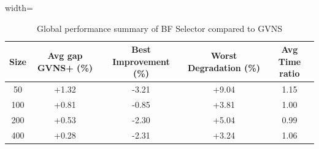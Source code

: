 \begin{table}[ht]
\centering
\footnotesize
\setlength{\tabcolsep}{4pt}
\caption{Global performance summary of BF Selector compared to GVNS}
\vspace{3mm}
\begin{adjustbox}{width=\textwidth}
\begin{tabular}{c c c c c}
\toprule
\textbf{Size} & \textbf{Avg gap GVNS+ (\%)} & \textbf{Best Improvement (\%)} & \textbf{Worst Degradation (\%)} & \textbf{Avg Time ratio} \\
\midrule
50  & +1.32 & -3.21 & +9.04  & 1.15 \\
100 & +0.81 & -0.85 & +3.81  & 1.00 \\
200 & +0.53 & -2.30 & +5.04  & 0.99 \\
400 & +0.28 & -2.31 & +3.24  & 1.06 \\
\bottomrule
\end{tabular}
\end{adjustbox}
\label{tab:bf_summary}
\end{table}